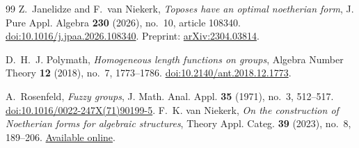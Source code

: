 \documentclass[12pt,a4paper]{amsart}
\theoremstyle{definition}
\begin{document}
\begin{thebibliography}{99}
Z.~Janelidze and F.~van Niekerk,
\emph{Toposes have an optimal noetherian form},
J. Pure Appl. Algebra \textbf{230} (2026), no.~10, article 108340.
\href{https://doi.org/10.1016/j.jpaa.2026.108340}{doi:10.1016/j.jpaa.2026.108340}.
Preprint: \href{https://arxiv.org/abs/2304.03814}{arXiv:2304.03814}.

D.~H.~J. Polymath,
\emph{Homogeneous length functions on groups},
Algebra Number Theory \textbf{12} (2018), no.~7, 1773--1786.
\href{https://doi.org/10.2140/ant.2018.12.1773}{doi:10.2140/ant.2018.12.1773}.

A.~Rosenfeld,
\emph{Fuzzy groups},
J. Math. Anal. Appl. \textbf{35} (1971), no.~3, 512--517.
\href{https://doi.org/10.1016/0022-247X(71)90199-5}{doi:10.1016/0022-247X(71)90199-5}.
F.~K. van Niekerk,
\emph{On the construction of Noetherian forms for algebraic structures},
Theory Appl. Categ. \textbf{39} (2023), no.~8, 189--206.
\href{https://www.tac.mta.ca/tac/volumes/39/8/39-08abs.html}{Available online}.

\end{thebibliography}
\enlargethispage{2\baselineskip}
\end{document}
